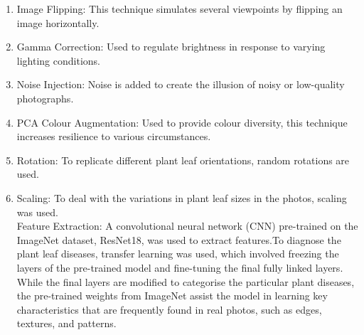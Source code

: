 \documentclass[conference]{IEEEtran}
\begin{document}
\begin{enumerate}
    \item Image Flipping: This technique simulates several viewpoints by flipping an image horizontally.
    \item Gamma Correction: Used to regulate brightness in response to varying lighting conditions.
    \item Noise Injection: Noise is added to create the illusion of noisy or low-quality photographs.
    \item PCA Colour Augmentation: Used to provide colour diversity, this technique increases resilience to various circumstances.
    \item Rotation: To replicate different plant leaf orientations, random rotations are used.
    \item Scaling: To deal with the variations in plant leaf sizes in the photos, scaling was used.\\
    Feature Extraction: A convolutional neural network (CNN) pre-trained on the ImageNet dataset, ResNet18, was used to extract features.To diagnose the plant leaf diseases, transfer learning was used, which involved freezing the layers of the pre-trained model and fine-tuning the final fully linked layers. While the final layers are modified to categorise the particular plant diseases, the pre-trained weights from ImageNet assist the model in learning key characteristics that are frequently found in real photos, such as edges, textures, and patterns.
\end{enumerate}
\end{document}

